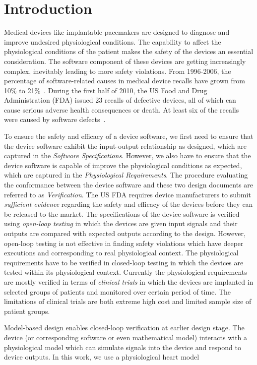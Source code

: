 \section{Introduction}
\label{introduction}

Medical devices like implantable pacemakers are designed to diagnose and improve undesired physiological conditions. The capability to affect the physiological conditions of the patient makes the safety of the devices an essential consideration. The software component of these devices are getting increasingly complex, inevitably leading to more safety violations. From 1996-2006, the percentage of software-related causes in medical device recalls have grown from 10\% to 21\%~\cite{recalls}. During the first half of 2010, the US Food and Drug Administration (FDA) issued 23 recalls of defective devices, all of which can cause serious adverse health consequences or death. At least six of the recalls were caused by software defects~\cite{killedbycode}. 

To ensure the safety and efficacy of a device software, we first need to ensure that the device software exhibit the input-output relationship as designed, which are captured in the \emph{Software Specifications}. However, we also have to ensure that the device software is capable of improve the physiological conditions as expected, which are captured in the \emph{Physiological Requirements}. The procedure evaluating the conformance between the device software and these two design documents are referred to as \emph{Verification}. The US FDA requires device manufacturers to submit \emph{sufficient evidence} regarding the safety and efficacy of the devices before they can be released to the market. The specifications of the device software is verified using \emph{open-loop testing} in which the devices are given input signals and their outputs are compared with expected outputs according to the design. However, open-loop testing is not effective in finding safety violations which have deeper executions and corresponding to real physiological context. The physiological requirements have to be verified in closed-loop testing in which the devices are tested within its physiological context. Currently the physiological requirements are mostly verified in terms of  \emph{clinical trials} in which the devices are implanted in selected groups of patients and monitored over certain period of time. The limitations of clinical trials are both extreme high cost and limited sample size of patient groups.

Model-based design enables closed-loop verification at earlier design stage. The device (or corresponding software or even mathematical model) interacts with a physiological model which can simulate signals into the device and respond to device outputs. In this work, we use a physiological heart model 

